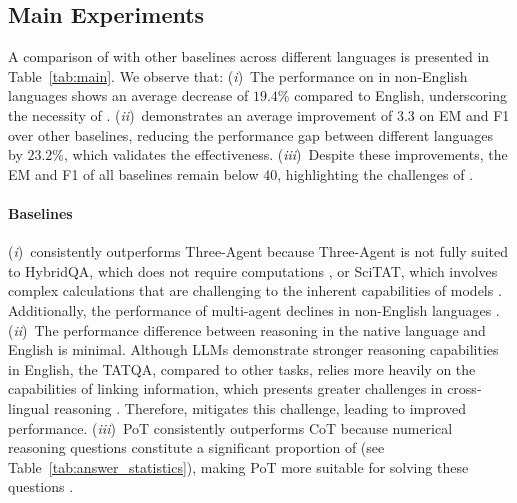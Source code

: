 \subsection{Main Experiments}
\label{subsec:main experiments}
A comparison of \ourmethod with other baselines across different languages is presented in Table~\ref{tab:main}. 
We observe that:
(\emph{i})~The performance on \ourdataset in non-English languages shows an average decrease of $19.4\%$ compared to English, underscoring the necessity of \ourdataset.
(\emph{ii})~\ourmethod demonstrates an average improvement of $3.3$ on EM and F1 over other baselines, reducing the performance gap between different languages by $23.2\%$, which validates the effectiveness.
(\emph{iii})~Despite these improvements, the EM and F1 of all baselines remain below $40$, highlighting the challenges of \ourdataset.


\paragraph{Baselines}
(\emph{i})~\ourmethod consistently outperforms Three-Agent because Three-Agent is not fully suited to HybridQA, which does not require computations \cite{chen-etal-2020-hybridqa}, or SciTAT, which involves complex calculations that are challenging to the inherent capabilities of models \cite{zhang2024scitat}. 
Additionally, the performance of multi-agent declines in non-English languages \cite{beyer2024clembench,chen-etal-2024-Cross-Agent}.
(\emph{ii})~The performance difference between reasoning in the native language and English is minimal. 
Although LLMs demonstrate stronger reasoning capabilities in English, the TATQA, compared to other tasks, relies more heavily on the capabilities of linking information, which presents greater challenges in cross-lingual reasoning \cite{min-etal-2019-cspider}. 
Therefore, \ourmethod mitigates this challenge, leading to improved performance. 
(\emph{iii})~PoT consistently outperforms CoT because numerical reasoning questions constitute a significant proportion of \ourdataset (see Table~\ref{tab:answer_statistics}), making PoT more suitable for solving these questions \cite{pot,zhao-etal-2024-docmath}.


